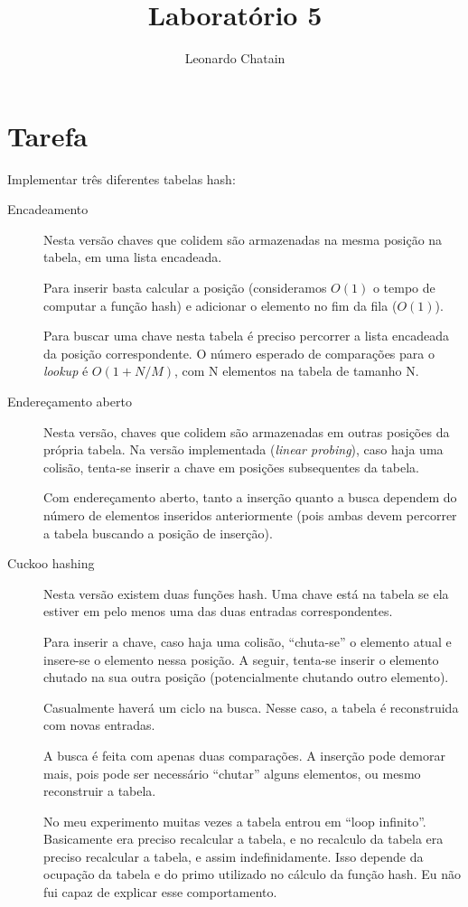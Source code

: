 \documentclass{article}
\title{Laboratório 5}
\author{Leonardo Chatain}
\begin{document}
\maketitle

\section{Tarefa}
Implementar três diferentes tabelas hash:

\begin{description}
 \item[Encadeamento] Nesta versão chaves que colidem são armazenadas na mesma posição na
tabela, em uma lista encadeada.

Para inserir basta calcular a posição (consideramos $O(1)$ o tempo de computar a função hash) e
adicionar o elemento no fim da fila ($O(1)$).

Para buscar uma chave nesta tabela é preciso percorrer a lista encadeada da posição
correspondente. O número esperado de comparações para o \emph{lookup} é $O(1 + N/M)$, com N
elementos na tabela de tamanho N.

 \item[Endereçamento aberto] Nesta versão, chaves que colidem são armazenadas em outras
posições da própria tabela. Na versão implementada (\emph{linear probing}), caso haja uma colisão,
tenta-se inserir a chave em posições subsequentes da tabela.

Com endereçamento aberto, tanto a inserção quanto a busca dependem do número de elementos inseridos
anteriormente (pois ambas devem percorrer a tabela buscando a posição de inserção).

 \item[Cuckoo hashing] Nesta versão existem duas funções hash. Uma chave está na tabela se ela
estiver em pelo menos uma das duas entradas correspondentes.

Para inserir a chave, caso haja uma colisão, ``chuta-se'' o elemento atual e insere-se o elemento
nessa posição. A seguir, tenta-se inserir o elemento chutado na sua outra posição (potencialmente
chutando outro elemento).

Casualmente haverá um ciclo na busca. Nesse caso, a tabela é reconstruida com novas entradas.

A busca é feita com apenas duas comparações. A inserção pode demorar mais, pois pode ser necessário
``chutar'' alguns elementos, ou mesmo reconstruir a tabela.

No meu experimento muitas vezes a tabela entrou em ``loop infinito''. Basicamente era preciso
recalcular a tabela, e no recalculo da tabela era preciso recalcular a tabela, e assim
indefinidamente. Isso depende da ocupação da tabela e do primo utilizado no cálculo da função hash.
Eu não fui capaz de explicar esse comportamento.

\end{description}
\end{document}
